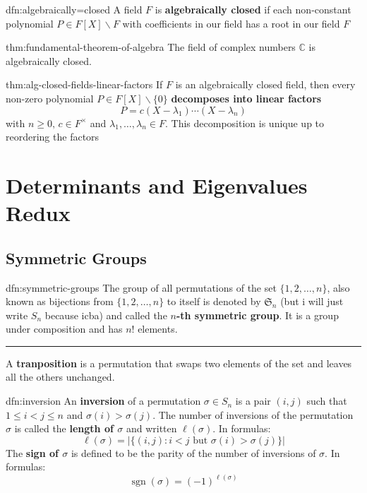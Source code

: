 \documentclass[landscape, 8pt]{extarticle}
\DeclareMathOperator{\sgn}{sgn}
\begin{document}
\begin{multicols}{3}
\begin{dfn}{dfn:algebraically=closed}{}
    A field $F$ is \textbf{algebraically closed} if each non-constant polynomial $P\in F[X]\backslash F$ with coefficients in our field has a root in our field $F$
\end{dfn}

\begin{thm}{thm:fundamental-theorem-of-algebra}{}
    The field of complex numbers $\mathbb{C}$ is algebraically closed.
\end{thm}

\begin{thm}{thm:alg-closed-fields-linear-factors}{}
    If $F$ is an algebraically closed field, then every non-zero polynomial $P\in F[X]\backslash \{0\}$ \textbf{decomposes into linear factors}
    \[P = c(X - \lambda_{1}) \cdots (X - \lambda_{n})\]
    with $n\ge 0,\, c\in F^{\times}$ and $\lambda_{1},\dots,\lambda_{n}\in F$. This decomposition is unique up to reordering the factors
\end{thm}



\section{Determinants and Eigenvalues Redux}

\subsection{Symmetric Groups}

\begin{dfn}{dfn:symmetric-groups}{}
    The group of all permutations of the set $\{1,2,\dots,n\}$, also known as bijections from $\{1,2,\dots,n\}$ to itself is denoted by $\mathfrak{S}_{n}$ (but i will just write $S_{n}$ because icba) and called the \textbf{$n$-th symmetric group}. It is a group under composition and has $n!$ elements.

    \noindent\rule{\textwidth}{0.2pt}
    A \textbf{tranposition} is a permutation that swaps two elements of the set and leaves all the others unchanged.
\end{dfn}

\begin{dfn}{dfn:inversion}{}
    An \textbf{inversion} of a permutation $\sigma\in S_{n}$ is a pair $(i, j)$ such that $1 \le i < j \le n$ and $\sigma(i) > \sigma(j)$. The number of inversions of the permutation $\sigma$ is called the \textbf{length of $\sigma$} and written $\ell(\sigma)$. In formulas:
    \[\ell(\sigma) = \lvert \{(i,j) : i < j \text{ but } \sigma(i) > \sigma(j)\} \rvert\]
    The \textbf{sign of $\sigma$} is defined to be the parity of the number of inversions of $\sigma$. In formulas:
    \[\sgn(\sigma) = (-1)^{\ell(\sigma)}\]
\end{dfn}


\end{multicols}
\end{document}
